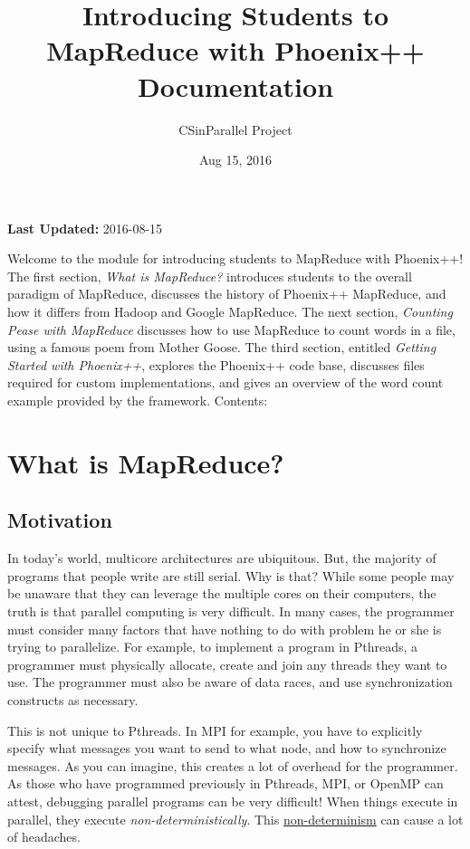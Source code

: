 \documentclass[letterpaper,10pt,openany,oneside]{sphinxmanual}
\title{Introducing Students to MapReduce with Phoenix++ Documentation}
\date{Aug 15, 2016}
\author{CSinParallel Project}
\begin{document}
\maketitle
\tableofcontents
{}\label{index::doc}


\textbf{Last Updated:} 2016-08-15

Welcome to the module for introducing students to MapReduce with Phoenix++!
The first section, \emph{What is MapReduce?} introduces students to the overall
paradigm of MapReduce, discusses the history of Phoenix++ MapReduce, and how it
differs from Hadoop and Google MapReduce. The next section, \emph{Counting Pease
with MapReduce} discusses how to use MapReduce to count words in a file, using
a famous poem from Mother Goose. The third section, entitled \emph{Getting Started
with Phoenix++}, explores the Phoenix++ code base, discusses files required for
custom implementations, and gives an overview of the word count example provided
by the framework.
Contents:


\chapter{What is MapReduce?}
\label{MRIntro/MRIntro:introducing-students-to-mapreduce-with-phoenix}\label{MRIntro/MRIntro:what-is-mapreduce}\label{MRIntro/MRIntro::doc}

\section{Motivation}
\label{MRIntro/MRIntro:motivation}
In today's world, multicore architectures are ubiquitous. But, the majority of
programs that people write are still serial. Why is that? While some people may
be unaware that they can leverage the multiple cores on their computers, the
truth is that parallel computing is very difficult. In many cases, the
programmer must consider many factors that have nothing to do with problem he
or she is trying to parallelize. For example, to implement a program in Pthreads,
a programmer must physically allocate, create and join any threads they want to
use. The programmer must also be aware of data races, and use synchronization
constructs as necessary.

This is not unique to Pthreads. In MPI for example, you have to explicitly
specify what messages you want to send to what node, and how to synchronize
messages. As you can imagine, this creates a lot of overhead for the
programmer. As those who have programmed previously in Pthreads, MPI, or OpenMP
can attest, debugging parallel programs can be very difficult! When things
execute in parallel, they execute \emph{non-deterministically}. This \href{https://en.wikipedia.org/wiki/Unbounded\_nondeterminism}{non-determinism}
can cause a lot of headaches.
\end{document}
